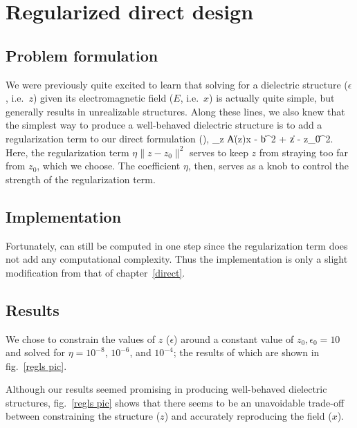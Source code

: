 \chapter{Regularized direct design}\label{regularized}
\section{Problem formulation}
We were previously quite excited to learn that solving for 
    a dielectric structure ($\epsilon$, i.e.~$z$) given 
    its electromagnetic field ($E$, i.e.~$x$) is actually quite simple,
    but generally results in unrealizable structures.
Along these lines, we also knew that the simplest way 
    to produce a well-behaved dielectric structure is 
    to add a regularization term to our direct formulation (),
    \BE \minimize_z \|A(z)x - b\|^2 + \eta \|z - z_0\|^2. \label{reg:problem}\EE
Here, the regularization term $\eta \|z - z_0\|^2$
    serves to keep $z$ from straying too far from $z_0$, which we choose.
The coefficient $\eta$, then, serves as a knob to control the
    strength of the regularization term.

\section{Implementation}
Fortunately,  can still be computed in one step
    since the regularization term does not add any computational complexity.
Thus the implementation is only a slight modification
    from that of chapter~\ref{direct}.

\section{Results}
We chose to constrain the values of $z$ ($\epsilon$) 
    around a constant value of $z_0, \epsilon_0 = 10$ and 
    solved  for $\eta=10^{-8}$, $10^{-6}$, and $10^{-4}$;
    the results of which are shown in fig.~\ref{regls pic}\cite{Lu10}.
    
Although our results seemed promising in producing well-behaved
    dielectric structures,
    fig.~\ref{regls pic} shows that there seems
    to be an unavoidable trade-off between 
    constraining the structure ($z$) 
    and accurately reproducing the field ($x$).

